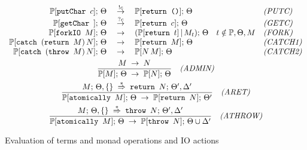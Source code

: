 \begin{figure}[t]
{\begin{minipage}{\linewidth}
\begin{gather*}
\begin{array}{rcll}
    \PP[\prg{putChar } c];\, \Theta & \stackrel{!c}{\tarrow}
                                       & \PP[\prg{return ()}];\, \Theta
                                       & \soslbl{PUTC} \\
    \PP[\prg{getChar }];\, \Theta& \stackrel{?c}{\tarrow}
                                       & \PP[\prg{return } c];\, \Theta
                                       & \soslbl{GETC} \\
    \PP[\prg{forkIO } M];\, \Theta& \tarrow
                                       & (\PP[\prg{return } t] \,|\, M_t);\, \Theta
                                            \quad t\notin \PP, \Theta, M
                                       & \soslbl{FORK} \\
    \PP[\prg{catch }(\prg{return }M)\, N];\,\Theta& \tarrow 
                                       & \PP[\prg{return } M];\,\Theta
                                       & \soslbl{CATCH1} \\
    \PP[\prg{catch }(\prg{throw }M)\, N];\,\Theta& \tarrow 
                                      & \PP[N\,M];\,\Theta
                                      & \soslbl{CATCH2}
\end{array}
\\
\sos{M \tarrow N}
    {\PP[M];\, \Theta \tarrow \PP[N];\, \Theta}
\quad\soslbl{ADMIN}
\\
%
%
\sos{M;\,\Theta,\emptyset
     \stackrel{*}{\tdarrow}
     \prg{return }N;\, \Theta',\Delta'}
   {\PP[\prg{atomically }M];\,\Theta \tarrow
    \PP[\prg{return }N];\,\Theta'}
  \quad\soslbl{ARET}
\\
\sos{M;\,\Theta,\emptyset
     \stackrel{*}{\tdarrow}
     \prg{throw }N;\, \Theta',\Delta'}
   {\PP[\prg{atomically }M];\,\Theta \tarrow
    \PP[\prg{throw }N];\,\Theta\cup\Delta'}
  \quad\soslbl{ATHROW}
\end{gather*}

\end{minipage}}\caption{Evaluation of terms and monad operations and IO actions}
\label{fig:sosadmin}
\end{figure}


